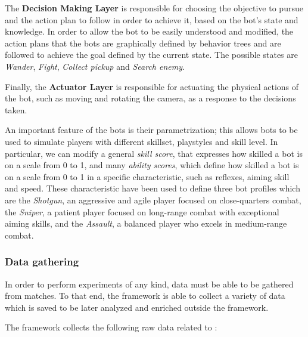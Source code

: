 \documentclass{Configuration_Files/PoliMi3i_thesis}
\begin{document}
The \textbf{Decision Making Layer} is responsible for choosing the objective to pursue and the action plan to follow in order to achieve it, based on the bot's state and knowledge. In order to allow the bot to be easily understood and modified, the action plans that the bots are graphically defined by behavior trees and are followed to achieve the goal defined by the current state. The possible states are \textit{Wander}, \textit{Fight}, \textit{Collect pickup} and \textit{Search enemy}. 

Finally, the \textbf{Actuator Layer} is responsible for actuating the physical actions of the bot, such as moving and rotating the camera, as a response to the decisions taken.

An important feature of the bots is their parametrization; this allows bots to be used to simulate players with different skillset, playstyles and skill level. In particular, we can modify a general \textit{skill score}, that expresses how skilled a bot is on a scale from 0 to 1, and many \textit{ability scores}, which define how skilled a bot is on a scale from 0 to 1 in a specific characteristic, such as reflexes, aiming skill and speed. These characteristic have been used to define three bot profiles which are the \textit{Shotgun}, an aggressive and agile player focused on close-quarters combat, the \textit{Sniper}, a patient player focused on long-range combat with exceptional aiming skills, and the \textit{Assault}, a balanced player who excels in medium-range combat.

\subsubsection{Data gathering}
\label{subsec:pa_data_gathering}
In order to perform experiments of any kind, data must be able to be gathered from matches. To that end, the framework is able to collect a variety of data which is saved to be later analyzed and enriched outside the framework.

The framework collects the following raw data related to :
\end{document}
